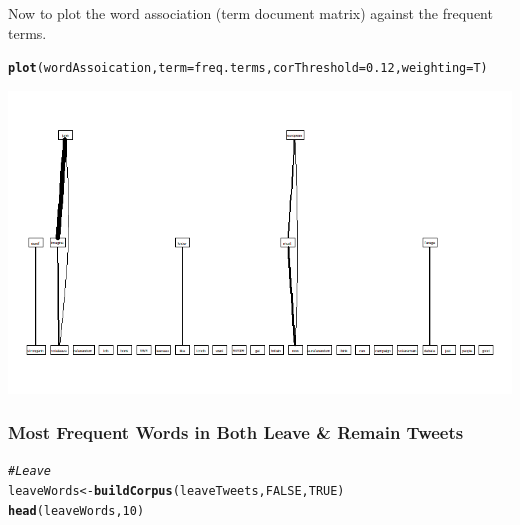 \documentclass[10pt  ,usenames, dvipsnames]{article}\usepackage[]{graphicx}\usepackage[]{color}
\makeatletter
\newcommand{\hlnum}[1]{\textcolor[rgb]{0.686,0.059,0.569}{#1}}%
\newcommand{\hlcom}[1]{\textcolor[rgb]{0.678,0.584,0.686}{\textit{#1}}}%
\newcommand{\hlstd}[1]{\textcolor[rgb]{0.345,0.345,0.345}{#1}}%
\newcommand{\hlkwb}[1]{\textcolor[rgb]{0.69,0.353,0.396}{#1}}%
\newcommand{\hlkwc}[1]{\textcolor[rgb]{0.333,0.667,0.333}{#1}}%
\newcommand{\hlkwd}[1]{\textcolor[rgb]{0.737,0.353,0.396}{\textbf{#1}}}%
\newenvironment{kframe}{%
 \def\at@end@of@kframe{}%
 \ifinner\ifhmode%
  \def\at@end@of@kframe{\end{minipage}}%
  \begin{minipage}{\columnwidth}%
 \fi\fi%
 \def\FrameCommand##1{\hskip\@totalleftmargin \hskip-\fboxsep
 \colorbox{shadecolor}{##1}\hskip-\fboxsep
     \hskip-\linewidth \hskip-\@totalleftmargin \hskip\columnwidth}%
 \MakeFramed {\advance\hsize-\width
   \@totalleftmargin\z@ \linewidth\hsize
   \@setminipage}}%
 {\par\unskip\endMakeFramed%
 \at@end@of@kframe}
\newenvironment{knitrout}{}{} %
\makeatother
\begin{document}
Now to plot the word association (term document matrix) against the frequent terms.
\begin{knitrout}
\color{fgcolor}\begin{kframe}
\begin{alltt}
\hlkwd{plot}\hlstd{(wordAssoication,} \hlkwc{term} \hlstd{= freq.terms,} \hlkwc{corThreshold} \hlstd{=} \hlnum{0.12}\hlstd{,} \hlkwc{weighting} \hlstd{= T)}
\end{alltt}
\end{kframe}
\end{knitrout}

\includegraphics{Rplot02.png}




% 



\clearpage

\subsubsection{Most Frequent Words in Both Leave \& Remain Tweets}

\begin{knitrout}
\color{fgcolor}\begin{kframe}
\begin{alltt}
\hlcom{#Leave}
\hlstd{leaveWords} \hlkwb{<-} \hlkwd{buildCorpus}\hlstd{(leaveTweets,} \hlnum{FALSE}\hlstd{,}\hlnum{TRUE}\hlstd{)}
\hlkwd{head}\hlstd{(leaveWords,} \hlnum{10}\hlstd{)}
\end{alltt}
\end{kframe}
\end{knitrout}
\end{document}
